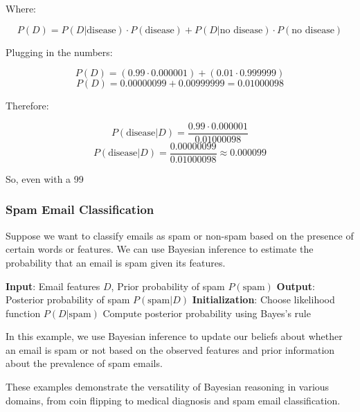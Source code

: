 \documentclass[12pt]{book} %
\begin{document}
Where:

\[ P(D) = P(D | \text{disease}) \cdot P(\text{disease}) + P(D | \text{no disease}) \cdot P(\text{no disease}) \]

Plugging in the numbers:

\[ P(D) = (0.99 \cdot 0.000001) + (0.01 \cdot 0.999999) \]
\[ P(D) = 0.00000099 + 0.00999999 = 0.01000098 \]

Therefore:

\[ P(\text{disease} | D) = \frac{0.99 \cdot 0.000001}{0.01000098} \]
\[ P(\text{disease} | D) = \frac{0.00000099}{0.01000098} \approx 0.000099 \]

So, even with a 99%


\subsubsection{Spam Email Classification}

Suppose we want to classify emails as spam or non-spam based on the presence of certain words or features. We can use Bayesian inference to estimate the probability that an email is spam given its features.

\FloatBarrier
\begin{algorithm}
\caption{Bayesian Inference for Spam Email Classification}
\begin{algorithmic}[1]
\State \textbf{Input}: Email features \(D\), Prior probability of spam \(P(\text{spam})\)
\State \textbf{Output}: Posterior probability of spam \(P(\text{spam} | D)\)
\State \textbf{Initialization}: Choose likelihood function \(P(D | \text{spam})\)
\State Compute posterior probability using Bayes's rule
\end{algorithmic}
\end{algorithm}
\FloatBarrier

In this example, we use Bayesian inference to update our beliefs about whether an email is spam or not based on the observed features and prior information about the prevalence of spam emails.

These examples demonstrate the versatility of Bayesian reasoning in various domains, from coin flipping to medical diagnosis and spam email classification.
\end{document}
